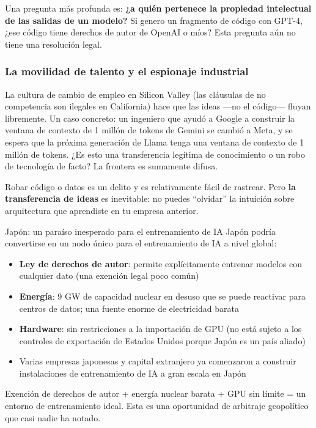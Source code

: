 \documentclass[a4paper]{article}
\begin{document}
Una pregunta más profunda es: \textbf{¿a quién pertenece la propiedad intelectual de las salidas de un modelo?} Si genero un fragmento de código con GPT-4, ¿ese código tiene derechos de autor de OpenAI o míos? Esta pregunta aún no tiene una resolución legal.

\subsubsection{La movilidad de talento y el espionaje industrial}

La cultura de cambio de empleo en Silicon Valley (las cláusulas de no competencia son ilegales en California) hace que las ideas —no el código— fluyan libremente. Un caso concreto: un ingeniero que ayudó a Google a construir la ventana de contexto de 1 millón de tokens de Gemini se cambió a Meta, y se espera que la próxima generación de Llama tenga una ventana de contexto de 1 millón de tokens. ¿Es esto una transferencia legítima de conocimiento o un robo de tecnología de facto? La frontera es sumamente difusa.

Robar código o datos es un delito y es relativamente fácil de rastrear. Pero \textbf{la transferencia de ideas} es inevitable: no puedes ``olvidar'' la intuición sobre arquitectura que aprendiste en tu empresa anterior.

\begin{knowledgebox}{Japón: un paraíso inesperado para el entrenamiento de IA}
Japón podría convertirse en un nodo único para el entrenamiento de IA a nivel global:
\begin{itemize}
    \item \textbf{Ley de derechos de autor}: permite explícitamente entrenar modelos con cualquier dato (una exención legal poco común)
    \item \textbf{Energía}: 9 GW de capacidad nuclear en desuso que se puede reactivar para centros de datos; una fuente enorme de electricidad barata
    \item \textbf{Hardware}: sin restricciones a la importación de GPU (no está sujeto a los controles de exportación de Estados Unidos porque Japón es un país aliado)
    \item Varias empresas japonesas y capital extranjero ya comenzaron a construir instalaciones de entrenamiento de IA a gran escala en Japón
\end{itemize}

Exención de derechos de autor + energía nuclear barata + GPU sin límite = un entorno de entrenamiento ideal. Esta es una oportunidad de arbitraje geopolítico que casi nadie ha notado.
\end{knowledgebox}
\end{document}
